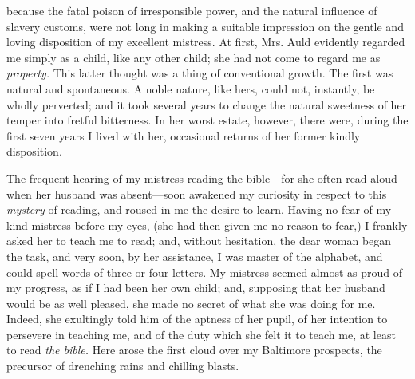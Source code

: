 because the fatal poison of irresponsible power, and the natural
influence of slavery customs, were not long in making a suitable
impression on the gentle and loving disposition of my excellent
mistress. At first, Mrs. Auld evidently regarded me simply as a child,
like any other child; she had not come to regard me as \emph{property.}
This latter thought was a thing of conventional growth. The first was
natural and spontaneous. A noble nature, like hers, could not,
instantly, be wholly perverted; and it took several years to change the
natural sweetness of her {}temper into fretful bitterness. In her worst
estate, however, there were, during the first seven years I lived with
her, occasional returns of her former kindly disposition.

The frequent hearing of my mistress reading the bible---for she often
read aloud when her husband was absent---soon awakened my curiosity in
respect to this \emph{mystery} of reading, and roused in me the desire
to learn. Having no fear of my kind mistress before my eyes, (she had
then given me no reason to fear,) I frankly asked her to teach me to
read; and, without hesitation, the dear woman began the task, and very
soon, by her assistance, I was master of the alphabet, and could spell
words of three or four letters. My mistress seemed almost as proud of my
progress, as if I had been her own child; and, supposing that her
husband would be as well pleased, she made no secret of what she was
doing for me. Indeed, she exultingly told him of the aptness of her
pupil, of her intention to persevere in teaching me, and of the duty
which she felt it to teach me, at least to read \emph{the bible.} Here
arose the first cloud over my Baltimore prospects, the precursor of
drenching rains and chilling blasts.

